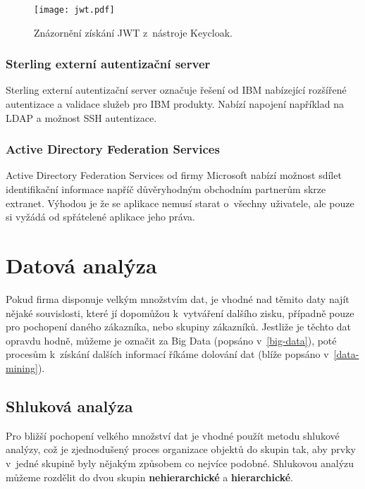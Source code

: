 \begin{figure}[htp]
\centering
\texttt{[image: jwt.pdf]}
\caption{Znázornění získání JWT z~nástroje Keycloak.}
\label{keycloak-jwt-fig}
\end{figure}
\newpage
\subsubsection{Sterling externí autentizační server}
\par Sterling externí autentizační server označuje řešení od IBM nabízející rozšířené autentizace a validace služeb pro IBM produkty. Nabízí napojení například na LDAP a možnost SSH autentizace. \cite{ibm-ster}

\subsubsection{Active Directory Federation Services}
\par Active Directory Federation Services od firmy Microsoft nabízí možnost sdílet identifikační informace napříč důvěryhodným obchodním partnerům skrze extranet. Výhodou je že se aplikace nemusí starat o~všechny uživatele, ale pouze si vyžádá od spřátelené aplikace jeho práva. \cite{ADFS}

\section{Datová analýza}
\par Pokud firma disponuje velkým množstvím dat, je vhodné nad těmito daty najít nějaké souvislosti, které jí dopomůžou k~vytváření dalšího zisku, případně pouze pro pochopení daného zákazníka, nebo skupiny zákazníků. Jestliže je těchto dat opravdu hodně, můžeme je označit za Big Data (popsáno v~\ref{big-data}), poté procesům k~získání dalších informací říkáme dolování dat (blíže popsáno v~\ref{data-mining}).

\subsection{Shluková analýza}
\par Pro bližší pochopení velkého množství dat je vhodné použít metodu shlukové analýzy, což je zjednodušený proces organizace objektů do skupin tak, aby prvky v~jedné skupině byly nějakým způsobem co nejvíce podobné. Shlukovou analýzu můžeme rozdělit do dvou skupin \textbf{nehierarchické} a \textbf{hierarchické}.

